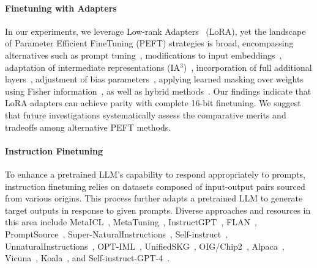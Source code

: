 \paragraph{Finetuning with Adapters} In our experiments, we leverage Low-rank Adapters~\citep{hu2021lora} (LoRA), yet the landscape of Parameter Efficient FineTuning (PEFT) strategies is broad, encompassing alternatives such as prompt tuning~\citep{qin2021learning,lester2021power,li2021prefix}, modifications to input embeddings~\citep{an2022input}, adaptation of intermediate representations (IA$^3$)~\citep{liu2022few}, incorporation of full additional layers~\citep{houlsby2019parameter}, adjustment of bias parameters~\citep{zaken2021bitfit}, applying learned masking over weights using Fisher information~\citep{sung2021training}, as well as hybrid methods~\citep{henderson2021compacter}. Our findings indicate that LoRA adapters can achieve parity with complete 16-bit finetuning. We suggest that future investigations systematically assess the comparative merits and tradeoffs among alternative PEFT methods.

\paragraph{Instruction Finetuning} To enhance a pretrained LLM’s capability to respond appropriately to prompts, instruction finetuning relies on datasets composed of input-output pairs sourced from various origins. This process further adapts a pretrained LLM to generate target outputs in response to given prompts. Diverse approaches and resources in this area include MetaICL~\citep{min2021metaicl}, MetaTuning~\citep{zhong2021adapting}, InstructGPT~\citep{ouyang2022training}, FLAN~\citep{wei2021finetuned,chung2022scaling}, PromptSource~\citep{bach2022promptsource}, Super-NaturalInstructions~\citep{wang2022super,sanh2021multitask}, Self-instruct~\citep{wang2022self}, UnnaturalInstructions~\citep{honovich2022unnatural}, OPT-IML~\citep{iyer2022opt}, UnifiedSKG~\citep{xie2022unifiedskg}, OIG/Chip2~\citep{laion2023}, Alpaca~\citep{alpaca}, Vicuna~\citep{vicuna2023}, Koala~\citep{koala_blogpost_2023}, and Self-instruct-GPT-4~\citep{peng2023instruction}.

